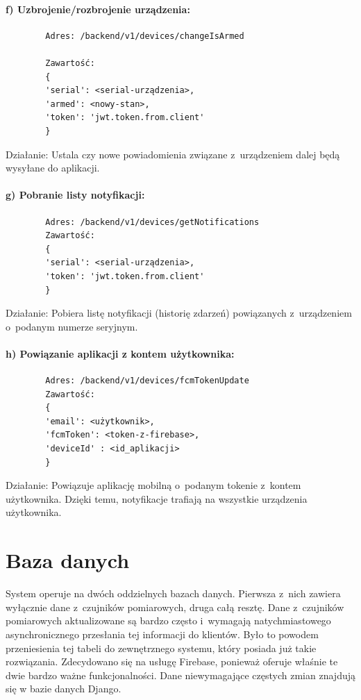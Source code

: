 \documentclass[polish,bachelor,a4paper,oneside]{ppfcmthesis}
\begin{document}
    \paragraph{f) Uzbrojenie/rozbrojenie urządzenia:}
    \begin{verbatim}
        Adres: /backend/v1/devices/changeIsArmed

        Zawartość:
        {
        'serial': <serial-urządzenia>,
        'armed': <nowy-stan>,
        'token': 'jwt.token.from.client'
        }
    \end{verbatim}
    Działanie: Ustala czy nowe powiadomienia związane z~urządzeniem dalej będą wysyłane do aplikacji.
    \paragraph{g) Pobranie listy notyfikacji:}
    \begin{verbatim}
        Adres: /backend/v1/devices/getNotifications
        Zawartość:
        {
        'serial': <serial-urządzenia>,
        'token': 'jwt.token.from.client'
        }
    \end{verbatim}
    Działanie: Pobiera listę notyfikacji (historię zdarzeń) powiązanych z~urządzeniem o~podanym numerze seryjnym.
    \paragraph{h) Powiązanie aplikacji z kontem użytkownika:}
    \begin{verbatim}
        Adres: /backend/v1/devices/fcmTokenUpdate
        Zawartość:
        {
        'email': <użytkownik>,
        'fcmToken': <token-z-firebase>,
        'deviceId' : <id_aplikacji>
        }
    \end{verbatim}
    Działanie: Powiązuje aplikację mobilną o~podanym tokenie z~kontem użytkownika. Dzięki temu, notyfikacje trafiają na wszystkie urządzenia użytkownika.
    \newline

    \section{Baza danych}
    System operuje na dwóch oddzielnych bazach danych. Pierwsza z~nich zawiera wyłącznie dane z~czujników pomiarowych, druga całą resztę. Dane z~czujników pomiarowych aktualizowane są bardzo często i~wymagają natychmiastowego asynchronicznego przesłania tej informacji do klientów. Było to powodem przeniesienia tej tabeli do zewnętrznego systemu, który posiada już takie rozwiązania. Zdecydowano się na usługę Firebase, ponieważ oferuje właśnie te dwie bardzo ważne funkcjonalności.  Dane niewymagające częstych zmian znajdują się w bazie danych Django.
\end{document}
